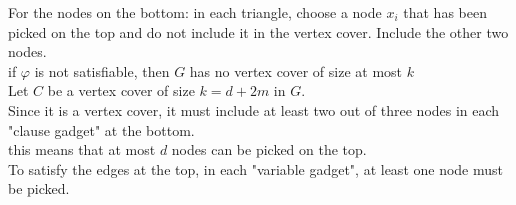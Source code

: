 \documentclass[onecolumn]{report}
\begin{document}
\indent \indent \indent For the nodes on the bottom: in each triangle, choose a node $x_i$ that has been picked on the top and do not include it in the vertex cover. Include the other two nodes.\\
\indent \indent if $\varphi$ is not satisfiable, then $G$ has no vertex cover of size at most $k$\\
\indent \indent \indent Let $C$ be a vertex cover of size $k = d + 2m$ in $G$.\\
\indent \indent \indent Since it is a vertex cover, it must include at least two out of three nodes in each "clause gadget" at the bottom.\\
\indent \indent \indent this means that at most $d$ nodes can be picked on the top.\\
\indent \indent \indent To satisfy the edges at the top, in each "variable gadget", at least one node must be picked.\\
\end{document}
